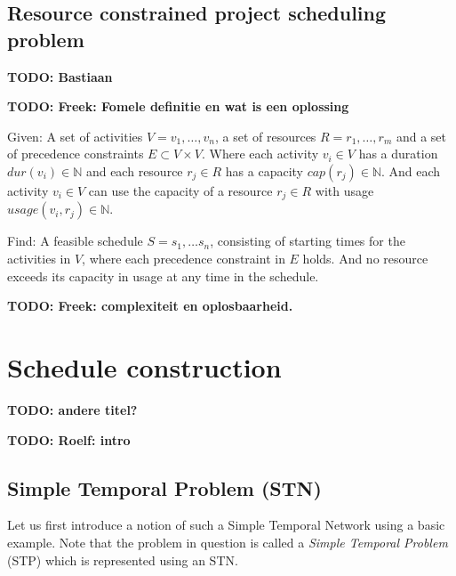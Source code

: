 \documentclass{article}
\theoremstyle{definition}
\newcommand{\TODO}[1]{{\color{red}\textbf{TODO: #1}}}
\newcommand{\capa}[1]{\ensuremath{cap(r_{#1})}} %
\newcommand{\dur}[1]{\ensuremath{dur(v_{#1})}} %
\newcommand{\usage}[2]{\ensuremath{usage(v_{#1}, r_{#2})}} %
\newenvironment{definition}[1][Definition]{\begin{trivlist}
\item[\hskip \labelsep {\bfseries #1}]}{\end{trivlist}}
\begin{document}
\subsection{Resource constrained project scheduling problem}

\TODO{Bastiaan}


\TODO{Freek: Fomele definitie en wat is een oplossing}

\begin{definition}
Given:
A set of activities $V = v_1, \ldots, v_n$, a set of resources $R = r_1, \ldots, r_m$ and a set of precedence constraints $E \subset V \times V$.
Where each activity $v_i \in V$ has a duration $\dur{i} \in \mathbb{N}$ and each resource $r_j \in R$ has a capacity $\capa{j} \in \mathbb{N}$. 
And each activity $v_i \in V$ can use the capacity of a resource $r_j \in R$ with usage $\usage{i}{j} \in \mathbb{N}$.

Find:
A feasible schedule $S = s_1, \ldots s_n$, consisting of starting times for the activities in $V$, where each precedence constraint in $E$ holds.
And no resource exceeds its capacity in usage at any time in the schedule.
\end{definition}


\TODO{Freek: complexiteit en oplosbaarheid.}


\newpage


\section{Schedule construction} \TODO{andere titel?}

\TODO{Roelf: intro}

\subsection{Simple Temporal Problem (STN)}
Let us first introduce a notion of such a Simple Temporal Network using a basic example. 
Note that the problem in question is called a \emph{Simple Temporal Problem} (STP) which is represented using an STN.
\end{document}
